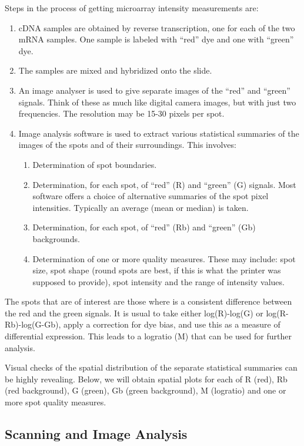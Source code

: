 \documentclass[a4paper,9pt]{article}\usepackage[]{graphicx}\usepackage[]{xcolor}
\begin{document}
Steps in the process of getting microarray intensity measurements are:
\begin{enumerate}
\item cDNA samples are obtained by reverse transcription, one for each
of the two mRNA samples. One sample is labeled with ``red'' dye and
one with ``green'' dye.
\item The samples are mixed and hybridized onto the slide.
\item An image analyser is used to give separate images of the ``red''
and ``green'' signals. Think of these as much like digital camera
images, but with just two frequencies. The resolution may be 15-30
pixels per spot.
\item Image analysis software is used to extract various statistical
summaries of the images of the spots and of their surroundings.  This
involves:
\begin{enumerate}
\item Determination of spot boundaries.
\item Determination, for each spot, of ``red'' (R) and ``green'' (G)
signals. Most software offers a choice of alternative summaries of the spot
pixel intensities.  Typically an average (mean or median) is taken.
\item Determination, for each spot, of ``red'' (Rb) and ``green'' (Gb)
backgrounds.
\item Determination of one or more quality measures.  These may include:
spot size, spot shape (round spots are best, if this is what the
printer was supposed to provide), spot intensity and the range of
intensity values.
\end{enumerate}
\end{enumerate}
The spots that are of interest are those where is a consistent difference
between the red and the green signals. It is usual to take either
log(R)-log(G) or log(R-Rb)-log(G-Gb), apply a correction for dye bias,
and use this as a measure of differential expression.  This leads to
a logratio (M) that can be used for further analysis.

Visual checks of the spatial distribution of the separate statistical
summaries can be highly revealing.  Below, we will obtain spatial plots
for each of R (red), Rb (red background), G (green), Gb (green background),
M (logratio) and one or more spot quality measures.

\subsection{Scanning and Image Analysis}
\end{document}

